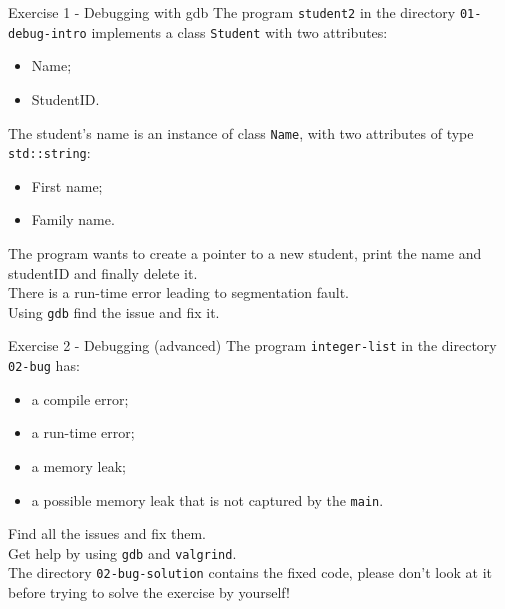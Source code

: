 \documentclass[10pt,aspectratio=169]{beamer}
\begin{document}
\begin{frame}{Exercise 1 - Debugging with gdb}
	The program \texttt{student2} in the directory \texttt{01-debug-intro} implements a class \texttt{Student} with two attributes:
	\begin{itemize}
		\item Name;
		\item StudentID.
	\end{itemize}
	\vspace{0.3cm}
	
	The student's name is an instance of class \texttt{Name}, with two attributes of type \texttt{std::string}:
	\begin{itemize}
		\item First name;
		\item Family name.
	\end{itemize}
	\vspace{0.3cm}
	
	The program wants to create a pointer to a new student, print the name and studentID and finally delete it. \\[3mm]
	
	There is a run-time error leading to segmentation fault. \\[3mm]
	
	Using \texttt{gdb} find the issue and fix it.
\end{frame}

\begin{frame}{Exercise 2 - Debugging (advanced)}
The program \texttt{integer-list} in the directory \texttt{02-bug} has:

\begin{itemize}
    \item a compile error;
    \item a run-time error;
    \item a memory leak;
    \item a possible memory leak that is not captured by the \texttt{main}.
\end{itemize}
\vspace{0.5cm}
Find all the issues and fix them. \\[3mm]

Get help by using \texttt{gdb} and \texttt{valgrind}.\\[3mm]

The directory \texttt{02-bug-solution} contains the fixed code,
please don't look at it before trying to solve the exercise by yourself!
\end{frame}
\end{document}
